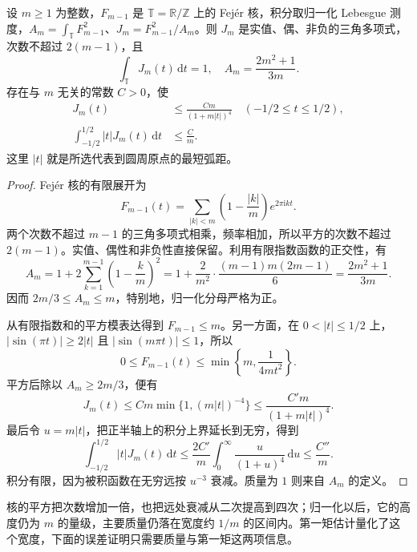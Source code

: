 \begin{lemma}
\label{b2:lem:approximation-jackson-kernel}
设 \(m\geq1\) 为整数，\(F_{m-1}\) 是 \(\mathbb T=\mathbb R/\mathbb Z\) 上的 Fejér 核，积分取归一化 Lebesgue 测度，\(A_m=\int_{\mathbb T}F_{m-1}^2\)、\(J_m=F_{m-1}^2/A_m\)。则 \(J_m\) 是实值、偶、非负的三角多项式，次数不超过 \(2(m-1)\)，且
\[
 \int_{\mathbb T}J_m(t)\,\mathrm dt=1,
 \quad A_m=\frac{2m^2+1}{3m}.
\]
存在与 \(m\) 无关的常数 \(C>0\)，使
\[
 \begin{aligned}
 J_m(t)&\leq\frac{Cm}{(1+m|t|)^4}
 \quad(-1/2\leq t\leq1/2),\\
 \int_{-1/2}^{1/2}|t|J_m(t)\,\mathrm dt&\leq\frac Cm.
 \end{aligned}
\]
这里 \(|t|\) 就是所选代表到圆周原点的最短弧距。
\end{lemma}
\begin{proof}
Fejér 核的有限展开为
\[
 F_{m-1}(t)=\sum_{|k|<m}\left(1-\frac{|k|}{m}\right)e^{2\pi\mathrm i kt}.
\]
两个次数不超过 \(m-1\) 的三角多项式相乘，频率相加，所以平方的次数不超过 \(2(m-1)\)。实值、偶性和非负性直接保留。利用有限指数函数的正交性，有
\[
 A_m=1+2\sum_{k=1}^{m-1}\left(1-\frac{k}{m}\right)^2
 =1+\frac{2}{m^2}\cdot\frac{(m-1)m(2m-1)}6
 =\frac{2m^2+1}{3m}.
\]
因而 \(2m/3\leq A_m\leq m\)，特别地，归一化分母严格为正。

从有限指数和的平方模表达得到 \(F_{m-1}\leq m\)。另一方面，在 \(0<|t|\leq1/2\) 上，\(|\sin(\pi t)|\geq2|t|\) 且 \(|\sin(m\pi t)|\leq1\)，所以
\[
 0\leq F_{m-1}(t)\leq
 \min\left\{m,\frac1{4mt^2}\right\}.
\]
平方后除以 \(A_m\geq2m/3\)，便有
\[
 J_m(t)\leq C m\min\{1,(m|t|)^{-4}\}
 \leq\frac{C' m}{(1+m|t|)^4}.
\]
最后令 \(u=m|t|\)，把正半轴上的积分上界延长到无穷，得到
\[
 \int_{-1/2}^{1/2}|t|J_m(t)\,\mathrm dt
 \leq\frac{2C'}m\int_0^\infty\frac{u}{(1+u)^4}\,\mathrm du
 \leq\frac{C''}m.
\]
积分有限，因为被积函数在无穷远按 \(u^{-3}\) 衰减。质量为 \(1\) 则来自 \(A_m\) 的定义。
\end{proof}

核的平方把次数增加一倍，也把远处衰减从二次提高到四次；归一化以后，它的高度仍为 \(m\) 的量级，主要质量仍落在宽度约 \(1/m\) 的区间内。第一矩估计量化了这个宽度，下面的误差证明只需要质量与第一矩这两项信息。


